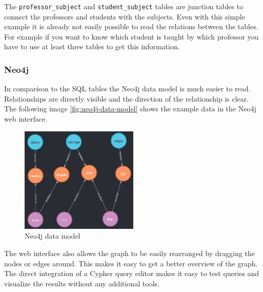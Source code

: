 The \texttt{professor\_subject} and \texttt{student\_subject} tables are
junction tables to connect the professors and students with the subjects. Even
with this simple example it is already not easily possible to read the relations
between the tables. For example if you want to know which student is taught by
which professor you have to use at least three tables to get this information.

\subsubsection{Neo4j}
In comparison to the SQL tables the Neo4j data model is much easier to read.
Relationships are directly visible and the direction of the relationship is
clear. The following image \autoref{fig:neo4j-data-model} shows the
example data in the Neo4j web interface.

\begin{figure}[!b]
    \centering
    \includegraphics[width=0.5\textwidth]{images/neo4j-data-model.png}
    \caption{Neo4j data model}
    \label{fig:neo4j-data-model}
\end{figure}

The web interface also allows the graph to be easily rearranged by dragging the
nodes or edges around. This makes it easy to get a better overview of the graph.
The direct integration of a Cypher query editor makes it easy to test queries
and visualize the results without any additional tools.